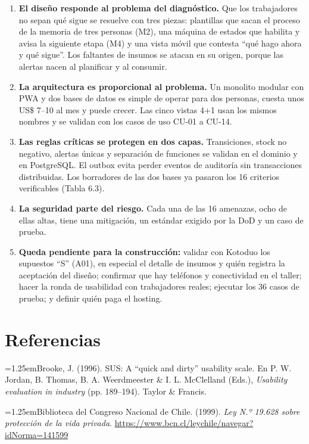 \documentclass[11pt,a4paper]{article}
\newenvironment{hangparas}{\par\hangindent=1.25em\hangafter=1\noindent}{\par}
\begin{document}
\begin{enumerate}
\item \textbf{El diseño responde al problema del diagnóstico.} Que los trabajadores no sepan qué sigue se resuelve con tres piezas: plantillas que sacan el proceso de la memoria de tres personas (M2), una máquina de estados que habilita y avisa la siguiente etapa (M4) y una vista móvil que contesta ``qué hago ahora y qué sigue''. Los faltantes de insumos se atacan en su origen, porque las alertas nacen al planificar y al consumir.
\item \textbf{La arquitectura es proporcional al problema.} Un monolito modular con PWA y dos bases de datos es simple de operar para dos personas, cuesta unos US\$ 7--10 al mes y puede crecer. Las cinco vistas 4+1 usan los mismos nombres y se validan con los casos de uso CU-01 a CU-14.
\item \textbf{Las reglas críticas se protegen en dos capas.} Transiciones, stock no negativo, alertas únicas y separación de funciones se validan en el dominio y en PostgreSQL. El outbox evita perder eventos de auditoría sin transacciones distribuidas. Los borradores de las dos bases ya pasaron los 16 criterios verificables (Tabla 6.3).
\item \textbf{La seguridad parte del riesgo.} Cada una de las 16 amenazas, ocho de ellas altas, tiene una mitigación, un estándar exigido por la DoD y un caso de prueba.
\item \textbf{Queda pendiente para la construcción:} validar con Kotoduo los supuestos ``S'' (A01), en especial el detalle de insumos y quién registra la aceptación del diseño; confirmar que hay teléfonos y conectividad en el taller; hacer la ronda de usabilidad con trabajadores reales; ejecutar los 36 casos de prueba; y definir quién paga el hosting.
\end{enumerate}

\newpage
\section{Referencias}

\begin{hangparas}Brooke, J. (1996). SUS: A ``quick and dirty'' usability scale. En P. W. Jordan, B. Thomas, B. A. Weerdmeester \& I. L. McClelland (Eds.), \textit{Usability evaluation in industry} (pp. 189--194). Taylor \& Francis.\end{hangparas}

\begin{hangparas}Biblioteca del Congreso Nacional de Chile. (1999). \textit{Ley N.º 19.628 sobre protección de la vida privada}. \url{https://www.bcn.cl/leychile/navegar?idNorma=141599}\end{hangparas}
\end{document}
